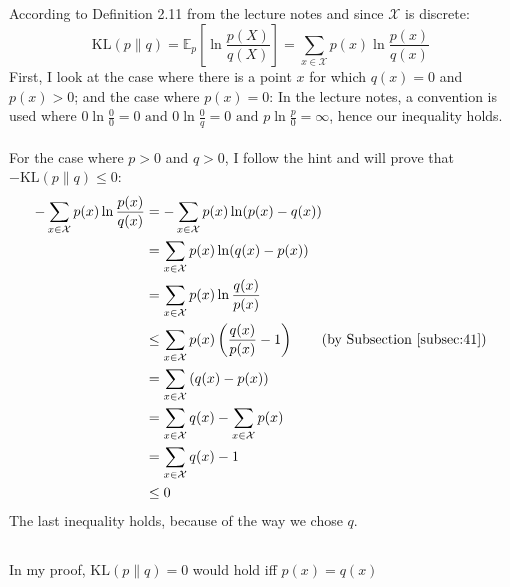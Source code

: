 \documentclass[a4paper]{article}
\begin{document}
\subsection{}
\label{subsec:42}
According to Definition 2.11 from the lecture notes and since
$\mathcal{X}$ is discrete:
\[
\mathrm{KL}(p \| q)=\mathbb{E}_{p}\left[\ln \frac{p(X)}{q(X)}\right]
= \sum_{x \in \mathcal{X}} p(x) \ln \frac{p(x)}{q(x)}
\]
First, I look at the case where there is a point $x$ for which
$q(x) = 0$ and $p(x) > 0$; and the case where $p(x) = 0$:
In the lecture notes, a convention is used where
$0 \ln \frac{0}{0}=0 \text { and } 0 \ln \frac{0}{q}=0 \text{ and } p \ln \frac{p}{0}=\infty$,
hence our inequality holds. \\\\
For the case where $p>0$ and  $q>0$, I follow the hint and will prove that
$-\mathrm{KL}(p \| q) \leq 0$:
\begin{align*}
  -\sum_{x \in \mathcal{X}} p(x) \ln \frac{p(x)}{q(x)}
  &=    -\sum_{x \in \mathcal{X}} p(x) \ln (p(x) - q(x)) \\
  &= \sum_{x \in \mathcal{X}} p(x) \ln (q(x) - p(x)) \\
  &= \sum_{x \in \mathcal{X}} p(x) \ln \frac{q(x)}{p(x)} \\
  &\leq \sum_{x \in \mathcal{X}} p(x)\left(\frac{q(x)}{p(x)}-1\right)
  \tag{by Subsection \ref{subsec:41}}\\
  &= \sum_{x \in \mathcal{X}} \left(q(x) - p(x)\right) \\
  &= \sum_{x \in \mathcal{X}} q(x) - \sum_{x \in \mathcal{X}} p(x)\\
  &= \sum_{x \in \mathcal{X}} q(x) - 1 \\
  &\leq 0
\end{align*}
The last inequality holds, because of the way we chose $q$.

\subsection{}
\label{subsec:43}
In my proof, $\mathrm{KL}(p \| q)=0$ would hold iff $p(x) = q(x)$
\end{document}
